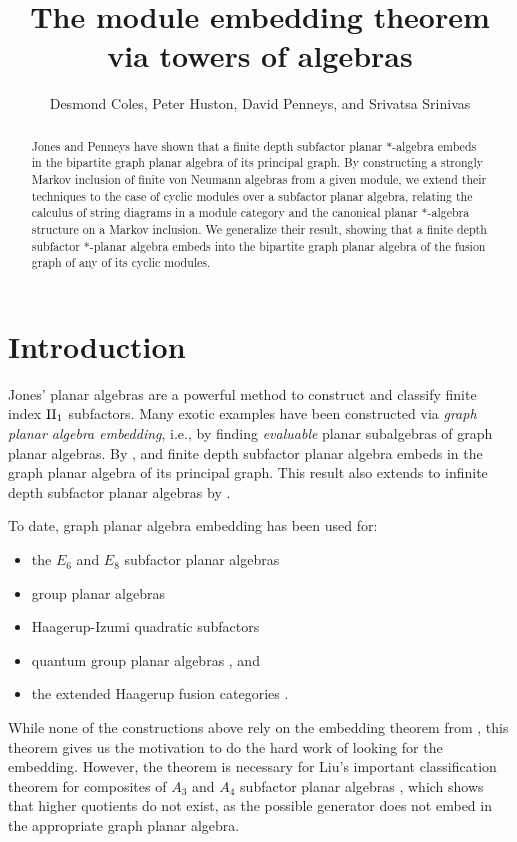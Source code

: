 \documentclass[11pt]{article}
\title{The module embedding theorem via towers of algebras}
\author{Desmond Coles, Peter Huston, David Penneys, and Srivatsa Srinivas}
\theoremstyle{plain}
\theoremstyle{definition}
\begin{document}

\maketitle
\begin{abstract}
Jones and Penneys have shown that a finite depth subfactor planar $*$-algebra embeds in the bipartite graph planar algebra of its principal graph. By constructing a strongly Markov inclusion of finite von Neumann algebras from a given module, we extend their techniques to the case of cyclic modules over a subfactor planar algebra, relating the calculus of string diagrams in a module category and the canonical planar $*$-algebra structure on a Markov inclusion. We generalize their result, showing that a finite depth subfactor $*$-planar algebra embeds into the bipartite graph planar algebra of the fusion graph of any of its cyclic modules. 
\end{abstract}


\section{Introduction}

Jones' planar algebras \cite{math.QA/9909027} are a powerful method to construct \cite{MR2979509,EH3} and classify \cite{MR3166042,MR3345186,1509.00038} finite index ${\rm II}_1$ subfactors.
Many exotic examples have been constructed via \emph{graph planar algebra embedding}, i.e., by finding \emph{evaluable} planar subalgebras of graph planar algebras.
By \cite{MR2812459}, and finite depth subfactor planar algebra embeds in the graph planar algebra of its principal graph.
This result also extends to infinite depth subfactor planar algebras by \cite{gpa}.

To date, graph planar algebra embedding has been used for:
\begin{itemize}
\item
the $E_6$ and $E_8$ subfactor planar algebras \cite{MR1929335}
\item
group planar algebras \cite{MR2511128}
\item
Haagerup-Izumi quadratic subfactors \cite{MR2679382,MR2822034,MR3314808,MR3394622,MR3402358}
\item
quantum group planar algebras \cite{MR3306607}, and
\item
the extended Haagerup fusion categories \cite{MR2979509,EH3}.
\end{itemize}
While none of the constructions above rely on the embedding theorem from \cite{MR2812459},
this theorem gives us the motivation to do the hard work of looking for the embedding.
However, the theorem is necessary for Liu's important classification theorem for composites of $A_3$ and $A_4$ subfactor planar algebras \cite{MR3345186}, which shows that higher quotients do not exist, as the possible generator does not embed in the appropriate graph planar algebra.
\end{document}
